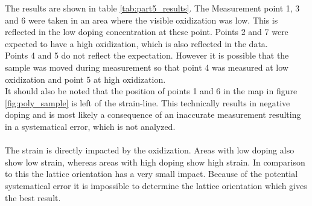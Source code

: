 \documentclass[12pt,a4paper]{article}
\begin{document}
The results are shown in table \ref{tab:part5_results}. The Measurement point 1, 3 and 6 were taken in an area where the visible oxidization was low. This is reflected in the low doping concentration at these point. Points 2 and 7 were expected to have a high oxidization, which is also reflected in the data.\\
Points 4 and 5 do not reflect the expectation. However it is possible that the sample was moved during measurement so that point 4 was measured at low oxidization and point 5 at high oxidization.\\
It should also be noted that the position of points 1 and 6 in the map in figure \ref{fig:poly_sample} is left of the strain-line. This technically results in negative doping and is most likely a consequence of an inaccurate measurement resulting in a systematical error, which is not analyzed.\\
\\
The strain is directly impacted by the oxidization. Areas with low doping also show low strain, whereas areas with high doping show high strain. In comparison to this the lattice orientation has a very small impact. Because of the potential systematical error it is impossible to determine the lattice orientation which gives the best result.
\end{document}
